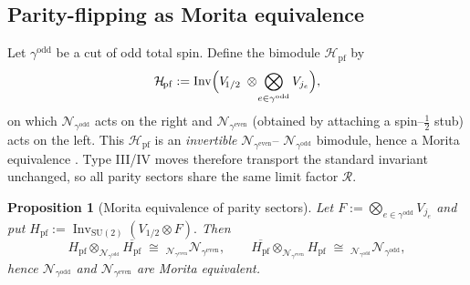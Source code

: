 \documentclass[11pt]{article}
\newtheorem{proposition}{Proposition}[section]
\begin{document}
\subsection*{Parity-flipping as Morita equivalence}

Let $\gamma^{\mathrm{odd}}$ be a cut of odd total spin.
Define the bimodule $\mathcal{H}_{\!\mathrm{pf}}$ by
\[
  \mathcal{H}_{\!\mathrm{pf}}
  :=\operatorname{Inv}\Bigl(
    V_{\!1/2}\;\otimes\!
    \bigotimes_{e\in\gamma^{\mathrm{odd}}}V_{j_e}
  \Bigr),
\]
on which
$\mathcal N_{\gamma^{\mathrm{odd}}}$ acts on the right and
$\mathcal N_{\gamma^{\mathrm{even}}}$ (obtained by attaching a spin–$\frac12$
stub) acts on the left.  This $\mathcal H_{\!\mathrm{pf}}$ is an
\emph{invertible} $\mathcal N_{\gamma^{\mathrm{even}}}$–%
$\mathcal N_{\gamma^{\mathrm{odd}}}$ bimodule, hence a Morita equivalence
\cite[Def.~2.1]{PopaCBMS}.  Type III/IV moves therefore transport the standard
invariant unchanged, so all parity sectors share the same limit factor
$\mathcal R$.

\begin{proposition}[Morita equivalence of parity sectors]\label{prop:Morita}
  Let
  \(
    F:=\bigotimes_{e\in\gamma^{\mathrm{odd}}} V_{j_e}
  \)
  and put
  \(
    H_{\mathrm{pf}}
    :=\operatorname{Inv}_{\mathrm{SU}(2)}(V_{1/2}\!\otimes\!F).
  \)
  Then
  \[
    H_{\mathrm{pf}}\!\otimes_{\mathcal N_{\gamma^{\mathrm{odd}}}}
    \overline{H_{\mathrm{pf}}}
    \;\cong\;
    {}_{\mathcal N_{\gamma^{\mathrm{even}}}}\mathcal N_{\gamma^{\mathrm{even}}},
    \qquad
    \overline{H_{\mathrm{pf}}}\!\otimes_{\mathcal N_{\gamma^{\mathrm{even}}}}
    H_{\mathrm{pf}}
    \;\cong\;
    {}_{\mathcal N_{\gamma^{\mathrm{odd}}}}\mathcal N_{\gamma^{\mathrm{odd}}},
  \]
  hence $\mathcal N_{\gamma^{\mathrm{odd}}}$ and
  $\mathcal N_{\gamma^{\mathrm{even}}}$ are Morita equivalent.
\end{proposition}
\end{document}
